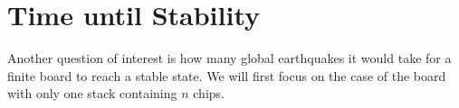 \documentclass[runningheads,a4paper]{llncs}
\begin{document}
%

\section{Time until Stability}
\label{Time until Stability}

Another question of interest is how many global earthquakes it would take for a finite board to reach a stable state. We will first focus on the case of the board with only one stack containing $n$ chips. 
\end{document}
